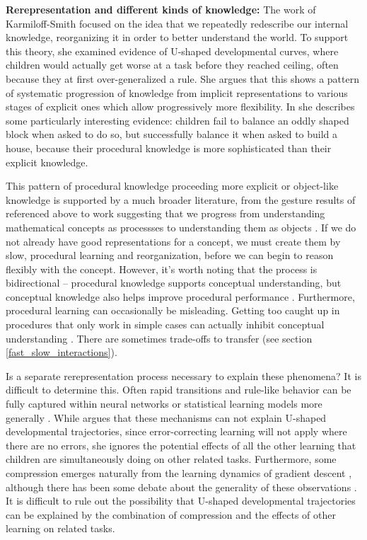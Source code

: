 \textbf{Rerepresentation and different kinds of knowledge:} The work of Karmiloff-Smith \citep[e.g.][]{Karmiloff-Smith1986, Karmiloff-Smith1992, Clark1993} focused on the idea that we repeatedly redescribe our internal knowledge, reorganizing it in order to better understand the world. To support this theory, she examined evidence of U-shaped developmental curves, where children would actually get worse at a task before they reached ceiling, often because they at first over-generalized a rule. She argues that this shows a pattern of systematic progression of knowledge from implicit representations to various stages of explicit ones which allow progressively more flexibility. In \citet{Karmiloff-Smith1986} she describes some particularly interesting evidence: children fail to balance an oddly shaped block when asked to do so, but successfully balance it when asked to build a house, because their procedural knowledge is more sophisticated than their explicit knowledge. \par 
This pattern of procedural knowledge proceeding more explicit or object-like knowledge is supported by a much broader literature, from the gesture results of \citet{Goldin-Meadow1993} referenced above to work suggesting that we progress from understanding mathematical concepts as processses to understanding them as objects \citep{Dubinsky1991, Hazzan1999}. If we do not already have good representations for a concept, we must create them by slow, procedural learning and reorganization, before we can begin to reason flexibly with the concept. However, it's worth noting that the process is bidirectional -- procedural knowledge supports conceptual understanding, but conceptual knowledge also helps improve procedural performance \citep{Rittle-Johnson2001}. Furthermore, procedural learning can occasionally be misleading. Getting too caught up in procedures that only work in simple cases can actually inhibit conceptual understanding \citep{McNeil2005}. There are sometimes trade-offs to transfer (see section \ref{fast_slow_interactions}). \par 
Is a separate rerepresentation process necessary to explain these phenomena? It is difficult to determine this. Often rapid transitions and rule-like behavior can be fully captured within neural networks or statistical learning models more generally \citep[e.g.][]{McClelland1999, McClelland2002, Schapiro2009, Aslin2012}. While \citet{Karmiloff-Smith1992} argues that these mechanisms can not explain U-shaped developmental trajectories, since error-correcting learning will not apply where there are no errors, she ignores the potential effects of all the other learning that children are simultaneously doing on other related tasks. Furthermore, some compression emerges naturally from the learning dynamics of gradient descent \citep{Tishby2015, Shwartz-Ziv2017, Achille2017}, although there has been some debate about the generality of these observations \citep[][see]{Saxe2018a}. It is difficult to rule out the possibility that U-shaped developmental trajectories can be explained by the combination of compression and the effects of other learning on related tasks. \par
